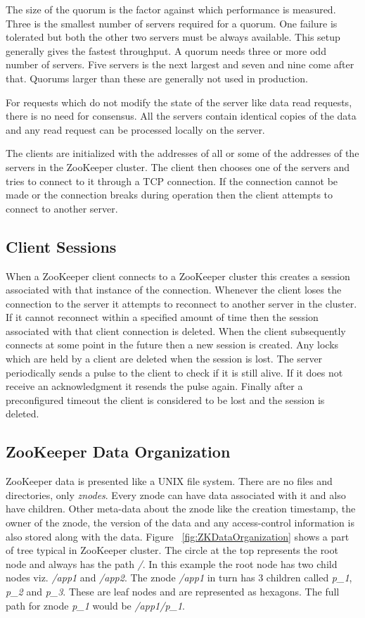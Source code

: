 The size of the quorum is the factor against which performance is measured. Three is the smallest number of servers required for a quorum. One failure is tolerated but both the other two servers must be always available. This setup generally gives the fastest throughput. A quorum needs three or more odd number of servers. Five servers is the next largest and seven and nine come after that. Quorums larger than these are generally not used in production.

For requests which do not modify the state of the server like data read requests, there is no need for consensus. All the servers contain identical copies of the data and any read request can be processed locally on the server. 

The clients are initialized with the addresses of all or some of the addresses of the servers in the ZooKeeper cluster. The client then chooses one of the servers and tries to connect to it through a TCP connection. If the connection cannot be made or the connection breaks during operation then the client attempts to connect to another server.

\subsection{Client Sessions}
When a ZooKeeper client connects to a ZooKeeper cluster this creates a session associated with that instance of the connection. Whenever the client loses the connection to the server it attempts to reconnect to another server in the cluster. If it cannot reconnect within a specified amount of time then the session associated with that client connection is deleted. When the client subsequently connects at some point in the future then a new session is created. Any locks which are held by a client are deleted when the session is lost. The server periodically sends a pulse to the client to check if it is still alive. If it does not receive an acknowledgment it resends the pulse again. Finally after a preconfigured timeout the client is considered to be lost and the session is deleted.

\subsection{ZooKeeper Data Organization}
ZooKeeper data is presented like a UNIX file system. There are no files and directories, only \textit{znodes}. Every znode can have data associated with it and also have children. Other meta-data about the znode like the creation timestamp, the owner of the znode, the version of the data and any access-control information is also stored along with the data. Figure ~\ref{fig:ZKDataOrganization} shows a part of tree typical in ZooKeeper cluster. The circle at the top represents the root node and always has the path \textit{/}. In this example the root node has two child nodes viz. \textit{/app1} and \textit{/app2}. The znode \textit{/app1} in turn has 3 children called \textit{p\_1}, \textit{p\_2} and \textit{p\_3}. These are leaf nodes and are represented as hexagons. The full path for znode \textit{p\_1} would be \textit{/app1/p\_1}.

